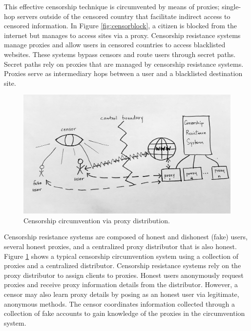 This effective censorship technique is circumvented by means of proxies; single-hop servers outside of the censored country that facilitate indirect access to censored information. In Figure \ref{fig:censorblock}, a citizen is blocked from the internet but manages to access sites via a proxy. Censorship resistance systems manage proxies and allow users in censored countries to access blacklisted websites. These systems bypass censors and route users through secret paths. Secret paths rely on proxies that are managed by censorship resistance systems. Proxies serve as intermediary hops between a user and a blacklisted destination site.

\begin{figure}[h!]
\centering
     \includegraphics[width=1.0\textwidth]{fig/censor_crs.png}
    \caption{Censorship circumvention via proxy distribution.}
    \label{fig:proxydistro}
\end{figure}

Censorship resistance systems are composed of honest and dishonest (fake) users, several honest proxies, and a centralized proxy distributor that is also honest. Figure \ref{fig:proxydistro} shows a typical censorship circumvention system using a collection of proxies and a centralized distributor. Censorship resistance systems rely on the proxy distributor to assign clients to proxies. Honest users anonymously request proxies and receive proxy information details from the distributor. However, a censor may also learn proxy details by posing as an honest user via legitimate, anonymous methods. The censor coordinates information collected through a collection of fake accounts to gain knowledge of the proxies in the circumvention system.


